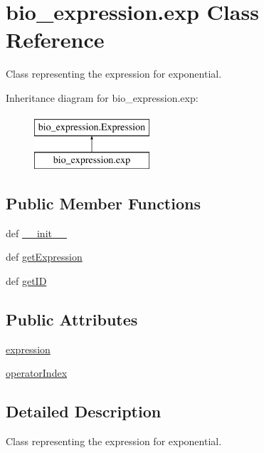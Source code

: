 \hypertarget{classbio__expression_1_1exp}{\section{bio\+\_\+expression.\+exp Class Reference}
\label{classbio__expression_1_1exp}
}


Class representing the expression for exponential.  


Inheritance diagram for bio\+\_\+expression.\+exp\+:\begin{figure}[H]
\begin{center}
\leavevmode
\includegraphics[height=2.000000cm]{d9/d60/classbio__expression_1_1exp}
\end{center}
\end{figure}
\subsection*{Public Member Functions}
\begin{DoxyCompactItemize}
\item 
def \hyperlink{classbio__expression_1_1exp_a479770a419ba79389547a9cfe8462c22}{\+\_\+\+\_\+init\+\_\+\+\_\+}
\item 
def \hyperlink{classbio__expression_1_1exp_a19eca171c865bca74ef2e0dc556afe22}{get\+Expression}
\item 
def \hyperlink{classbio__expression_1_1exp_a06c618cea61d387ebfa13a82fe9a3159}{get\+I\+D}
\end{DoxyCompactItemize}
\subsection*{Public Attributes}
\begin{DoxyCompactItemize}
\item 
\hyperlink{classbio__expression_1_1exp_a9590d174f4e17fcf29d14c458d4e4e29}{expression}
\item 
\hyperlink{classbio__expression_1_1exp_ae8ade0c740b0b6732ddacc6f247284bb}{operator\+Index}
\end{DoxyCompactItemize}


\subsection{Detailed Description}
Class representing the expression for exponential. 

